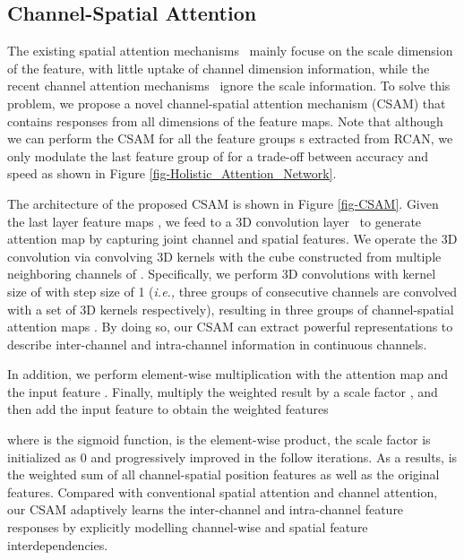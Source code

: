 \documentclass[runningheads]{llncs}
\begin{document}
\subsection{Channel-Spatial Attention}
\label{sec-csam}
The existing spatial attention mechanisms~\cite{woo2018cbam,kim2018ram} mainly focuse on the scale dimension of the feature, with little uptake of channel dimension information, while the recent channel attention mechanisms~\cite{zhang2018image,zhang2018residual,dai2019second} ignore the scale information. 
To solve this problem, we propose a novel channel-spatial attention mechanism (CSAM) that contains responses from all dimensions of the feature maps. Note that although we can perform the CSAM for all the feature groups s extracted from RCAN, we only modulate the last feature group of  for a trade-off between accuracy and speed as shown in Figure \ref{fig-Holistic_Attention_Network}.




The architecture of the proposed CSAM is shown in Figure \ref{fig-CSAM}. 
Given the last layer feature maps , 
we feed  to a 3D convolution layer~\cite{ji20123d} to generate attention map by capturing joint
channel and spatial features.
We operate the 3D convolution via convolving 3D kernels with the cube constructed from multiple neighboring channels of . Specifically, we perform 3D convolutions with kernel size of  with step size of 1 (\textit{i.e.,} three groups of consecutive channels are convolved with a set of 3D kernels respectively), resulting
in three groups of channel-spatial attention maps .
By doing so, our CSAM can extract powerful representations to describe inter-channel and intra-channel information in continuous channels.

In addition, we perform element-wise multiplication with the attention map  and the input feature . Finally, multiply the weighted result by a scale factor , and then add the input feature  to obtain the weighted features

where  is the sigmoid function,  is the element-wise product, the scale factor  is initialized as 0 and progressively improved in the follow iterations. 
As a results,  is the weighted sum of all channel-spatial position features as well as the original features. Compared with conventional spatial attention and channel attention, our CSAM adaptively learns the inter-channel and intra-channel feature responses by explicitly modelling channel-wise and spatial feature interdependencies.
\end{document}
